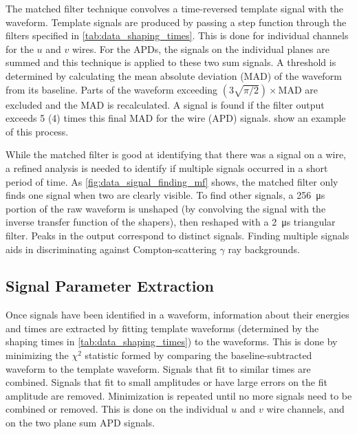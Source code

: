 \documentclass[herrin-thesis.tex]{subfiles}
\begin{document}
The matched filter technique\cite{North:1963fk} convolves a time-reversed template signal with the waveform. Template signals are produced by passing a step function through the filters specified in \cref{tab:data_shaping_times}. This is done for individual channels for the \(u\) and \(v\) wires. For the APDs, the signals on the individual planes are summed and this technique is applied to these two sum signals. A threshold is determined by calculating the mean absolute deviation (MAD) of the waveform from its baseline. Parts of the waveform exceeding \((3\sqrt{\pi/2})\times\text{MAD}\) are excluded and the MAD is recalculated. A signal is found if the filter output exceeds 5 (4) times this final MAD for the wire (APD) signals.  show an example of this process.

While the matched filter is good at identifying that there was a signal on a wire, a refined analysis is needed to identify if multiple signals occurred in a short period of time. As \cref{fig:data_signal_finding_mf} shows, the matched filter only finds one signal when two are clearly visible. To find other signals, a \SI{256}{\micro\s} portion of the raw waveform is unshaped (by convolving the signal with the inverse transfer function of the shapers), then reshaped with a \SI{2}{\micro\s} triangular filter. Peaks in the output correspond to distinct signals. Finding multiple signals aids in discriminating against Compton-scattering \(\gamma\) ray backgrounds.

\subsection{Signal Parameter Extraction}
Once signals have been identified in a waveform, information about their energies and times are extracted by fitting template waveforms (determined by the shaping times in \cref{tab:data_shaping_times}) to the waveforms. This is done by minimizing the \(\chi^2\) statistic formed by comparing the baseline-subtracted waveform to the template waveform. Signals that fit to similar times are combined. Signals that fit to small amplitudes or have large errors on the fit amplitude are removed. Minimization is repeated until no more signals need to be combined or removed. This is done on the individual \(u\) and \(v\) wire channels, and on the two plane sum APD signals.
\end{document}
